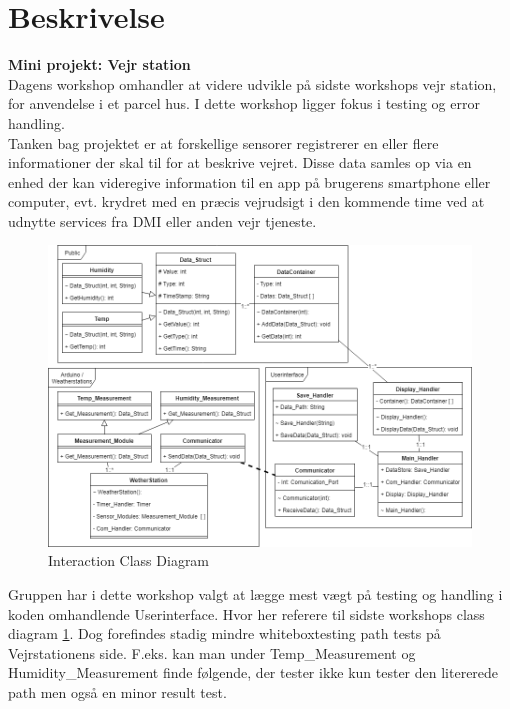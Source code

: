 \documentclass[11pt]{article}
\renewcommand{\baselinestretch}{1.20}
\begin{document}
    
    
    
    \renewcommand{\baselinestretch}{0.8}
    \tableofcontents
    \renewcommand{\baselinestretch}{1.20}
    \newpage
    
    \section{Beskrivelse}
    \textbf{Mini projekt: Vejr station}\\
    Dagens workshop omhandler at videre udvikle på sidste workshops vejr station, for anvendelse i et parcel hus. I dette workshop ligger fokus i testing og error handling.\\
    Tanken bag projektet er at forskellige sensorer registrerer en eller flere informationer der skal til for at beskrive vejret. Disse data samles op via en enhed der kan videregive information til en app på brugerens smartphone eller computer, evt. krydret med en præcis vejrudsigt i den kommende time ved at udnytte services fra DMI
    eller anden vejr tjeneste.
    
    \begin{figure}[H]
        \centering
        \includegraphics[width=1\textwidth,angle=0]{Struktureret_System_Udvikling/Workshop_2/Assets/Workshop2_ClassDiagram.png}
        \caption{Interaction Class Diagram}
        \label{fig:ClassDiagram}
    \end{figure}
    \noindent
    Gruppen har i dette workshop valgt at lægge mest vægt på testing og handling i koden omhandlende Userinterface. Hvor her referere til sidste workshops class diagram \ref{fig:ClassDiagram}.
    Dog forefindes stadig mindre whiteboxtesting path tests på Vejrstationens side. F.eks. kan man under Temp\_Measurement og Humidity\_Measurement finde følgende, der tester ikke kun tester den litererede path men også en minor result test.
    
\end{document}

